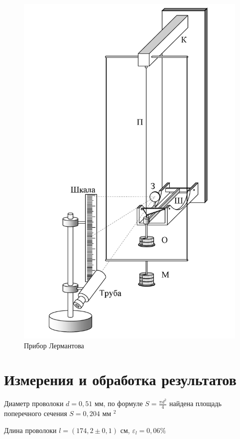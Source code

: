 \documentclass[a4paper, 12pt]{article}
\begin{document}
\begin{figure}[h]
        \centering
        \includegraphics[scale = 0.5]{lermantov.png}
        \caption{Прибор Лермантова}
    \end{figure}

\section{Измерения и обработка результатов}

Диаметр проволоки $d = 0,51$ мм, по формуле $S=\frac{\pi d^2}{4}$ найдена площадь поперечного сечения $S = 0,204$ мм $^2$

Длина проволоки $l=(174,2 \pm 0,1)$ см, $\varepsilon_l = 0,06\%$
\end{document}
